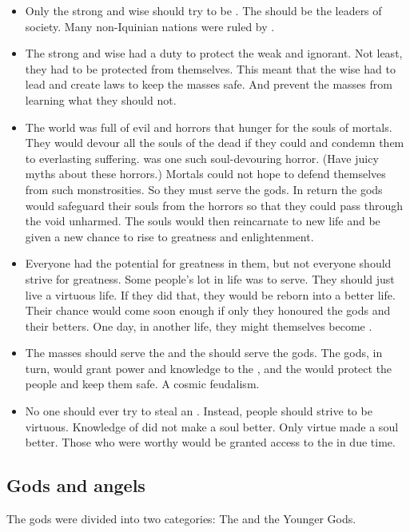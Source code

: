 \begin{itemize}
  \item 
    Only the strong and wise should try to be \rethyaxes.
    The \rethyaxes should be the leaders of society.
    Many non-Iquinian nations were ruled by \rethyaxes.
  \item 
    The strong and wise had a duty to protect the weak and ignorant.
    Not least, they had to be protected from themselves.
    This meant that the wise had to lead and create laws to keep the masses safe. 
    And prevent the masses from learning what they should not. 
  \item 
    The world was full of evil and horrors that hunger for the souls of mortals. 
    They would devour all the souls of the dead if they could and condemn them to everlasting suffering. 
    \Iquin was one such soul-devouring horror.
    (Have juicy myths about these horrors.)
    Mortals could not hope to defend themselves from such monstrosities.
    So they must serve the gods. 
    In return the gods would safeguard their souls from the horrors so that they could pass through the void unharmed. 
    The souls would then reincarnate to new life and be given a new chance to rise to greatness and enlightenment. 
  \item 
    Everyone had the potential for greatness in them, but not everyone should strive for greatness. 
    Some people's lot in life was to serve. 
    They should just live a virtuous life.
    If they did that, they would be reborn into a better life.
    Their chance would come soon enough if only they honoured the gods and their betters.
    One day, in another life, they might themselves become \rethyaxes. 
  \item 
    The masses should serve the \rethyaxes and the \rethyaxes should serve the gods.
    The gods, in turn, would grant power and knowledge to the \rethyaxes, and the \rethyaxes would protect the people and keep them safe. 
    A cosmic feudalism. 
  \item 
    No one should ever try to steal an \arcanum. 
    Instead, people should strive to be virtuous.
    Knowledge of \arcana did not make a soul better.
    Only virtue made a soul better. 
    Those who were worthy would be granted access to the \arcana in due time. 
\end{itemize}








\subsection{Gods and angels}
The \rethyax gods were divided into two categories: 
The \Primordials and the Younger Gods. 





